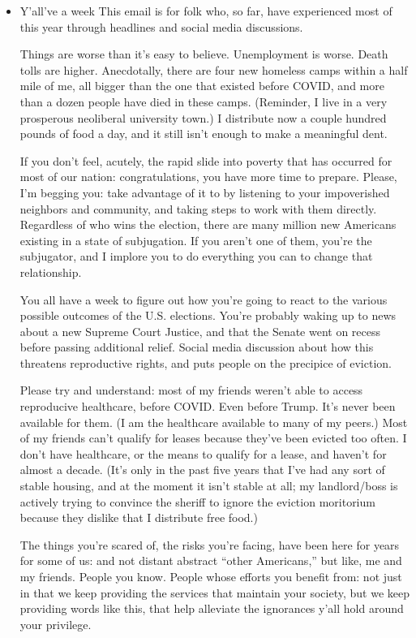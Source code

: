 \documentclass[11pt]{article}
\begin{document}
\begin{itemize}
\item Y'all've a week
\label{sec:orgec0f963}
This email is for folk who, so far, have experienced most of this year through headlines and social media discussions.

Things are worse than it’s easy to believe. Unemployment is worse. Death tolls are higher. Anecdotally, there are four new homeless camps within a half mile of me, all bigger than the one that existed before COVID, and more than a dozen people have died in these camps. (Reminder, I live in a very prosperous neoliberal university town.) I distribute now a couple hundred pounds of food a day, and it still isn’t enough to make a meaningful dent.

If you don’t feel, acutely, the rapid slide into poverty that has occurred for most of our nation: congratulations, you have more time to prepare. Please, I’m begging you: take advantage of it to by listening to your impoverished neighbors and community, and taking steps to work with them directly. Regardless of who wins the election, there are many million new Americans existing in a state of subjugation. If you aren’t one of them, you’re the subjugator, and I implore you to do everything you can to change that relationship.

You all have a week to figure out how you’re going to react to the various possible outcomes of the U.S. elections. You’re probably waking up to news about a new Supreme Court Justice, and that the Senate went on recess before passing additional relief. Social media discussion about how this threatens reproductive rights, and puts people on the precipice of eviction.

Please try and understand: most of my friends weren’t able to access reproducive healthcare, before COVID. Even before Trump. It’s never been available for them. (I am the healthcare available to many of my peers.) Most of my friends can’t qualify for leases because they’ve been evicted too often. I don’t have healthcare, or the means to qualify for a lease, and haven’t for almost a decade. (It’s only in the past five years that I’ve had any sort of stable housing, and at the moment it isn’t stable at all; my landlord/boss is actively trying to convince the sheriff to ignore the eviction moritorium because they dislike that I distribute free food.)

The things you’re scared of, the risks you’re facing, have been here for years for some of us: and not distant abstract “other Americans,” but like, me and my friends. People you know. People whose efforts you benefit from: not just in that we keep providing the services that maintain your society, but we keep providing words like this, that help alleviate the ignorances y’all hold around your privilege.


\end{itemize}
\end{document}

